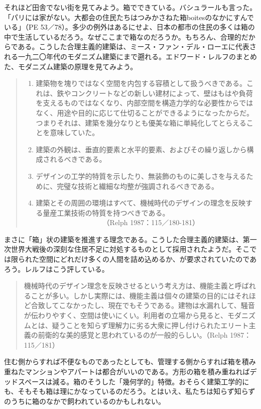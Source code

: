 \documentclass[b5j,twoside,twocolumn]{utarticle}
\begin{document}
それほど田舎でない街を見てみよう。箱でできている。バシュラールも言った。「パリには家がない。大都会の住民たちはつみかさねた箱boitesのなかにすんでいる」（PE 53／78）。多少の例外はあるにせよ、日本の都市の住民の多くは箱の中で生活しているだろう。なぜここまで箱なのだろうか。もちろん、合理的だからである。こうした合理主義的建築は、ミース・ファン・デル・ローエに代表される一九二〇年代のモダニズム建築にまで遡れる。エドワード・レルフのまとめた、モダニズム建築の原理を見てみよう。
\begin{quote}
\begin{enumerate}
\item  建築物を塊りではなく空間を内包する容積として扱うべきである。これは、鉄やコンクリートなどの新しい建材によって、壁はもはや負荷を支えるものではなくなり、内部空間を構造力学的な必要性からではなく、用途や目的に応じて仕切ることができるようになったからだ。つまりそれは、建築を幾分なりとも優美な箱に単純化してとらえることを意味していた。
\item 建築の外観は、垂直的要素と水平的要素、およびその繰り返しから構成されるべきである。
\item デザインの工学的特質を示したり、無装飾のものに美しさを与えるために、完璧な技術と繊細な均整が強調されるべきである。
\item 建築とその周囲の環境はすべて、機械時代のデザインの理念を反映する量産工業技術の特質を持つべきである。\\　　　　　　　　　　（Relph 1987：115／180-181）
\end{enumerate}
\end{quote}
まさに「箱」状の建築を推進する理念である。こうした合理主義的建築は、第一次世界大戦後の深刻な住居不足に対処するものとして採用されたようだ。そこでは限られた空間にどれだけ多くの人間を詰め込めるか、が要求されていたのであろう。レルフはこう評している。
\begin{quote}
機械時代のデザイン理念を反映させるという考え方は、機能主義と呼ばれることが多い。しかし実際には、機能主義は個々の建築の目的にはそれほど合致してこなかったし、現在でもそうである。建物は水漏れして、騒音が伝わりやすく、空間は使いにくい。利用者の立場から見ると、モダニズムとは、疑うことを知らず理解力に劣る大衆に押し付けられたエリート主義の前衛的な美的感覚と思われているのが一般的らしい。（Relph 1987：115／181）
\end{quote}
住む側からすれば不便なものであったとしても、管理する側からすれば箱を積み重ねたマンションやアパートは都合がいいのである。方形の箱を積み重ねればデッドスペースは減る。箱のそうした「幾何学的」特徴。おそらく建築工学的にも、そもそも箱は理にかなっているのだろう。とはいえ、私たちは知らず知らずのうちに箱のなかで飼われているのかもしれない。
\end{document}
